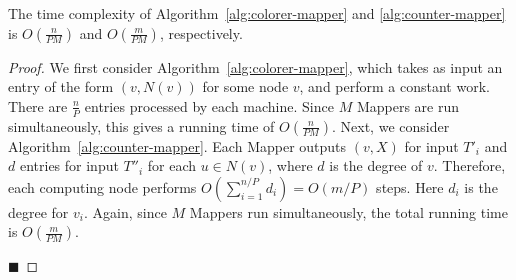 
\begin{lemma}
\label{lemma:colorer-counter-mapper}
The time complexity of Algorithm~\ref{alg:colorer-mapper} and 
\ref{alg:counter-mapper} is $O(\frac{n}{PM})$ and $O(\frac{m}{PM})$, respectively.

\end{lemma}

\begin{proof}

We first consider Algorithm~\ref{alg:colorer-mapper}, which takes as input an
entry of the form $(v, N(v))$ for some node $v$, and perform a constant work.
There are $\frac{n}{P}$ entries processed by each machine. Since $M$ Mappers are
run simultaneously, this gives a running time of $O(\frac{n}{PM})$.  Next, we
consider Algorithm~\ref{alg:counter-mapper}. Each Mapper outputs $(v, X)$ for
input $T'_i$ and $d$ entries for input $T''_i$ for each $u \in N(v)$, where $d$
is the degree of $v$. Therefore, each computing node performs
$O(\sum_{i=1}^{n/P}{d_i})=O(m/P)$ steps. Here $d_i$ is the degree for $v_i$.
Again, since $M$ Mappers run simultaneously, the total running time is $
O(\frac{m}{PM})$.

\hfill\ensuremath{\blacksquare}
\end{proof}
%



